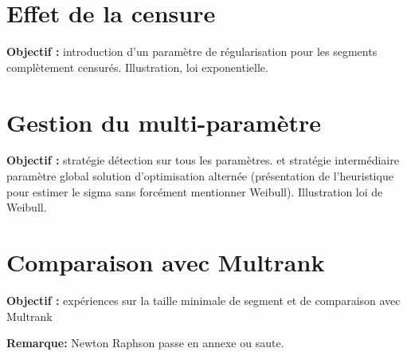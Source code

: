 \documentclass[12pt, twoside]{report}
\begin{document}
\section{Effet de la censure}

\textbf{Objectif :} introduction d'un paramètre de régularisation pour les segments complètement censurés. Illustration, loi exponentielle. 

\section{Gestion du multi-paramètre}

\textbf{Objectif :} stratégie détection sur tous les paramètres. et stratégie intermédiaire paramètre global solution d'optimisation alternée (présentation de l'heuristique pour estimer le sigma sans forcément mentionner Weibull). Illustration loi de Weibull. 

\section{Comparaison avec Multrank}

\textbf{Objectif :} expériences sur la taille minimale de segment et de comparaison avec Multrank

\textbf{Remarque:} Newton Raphson passe en annexe ou saute.






\end{document}
